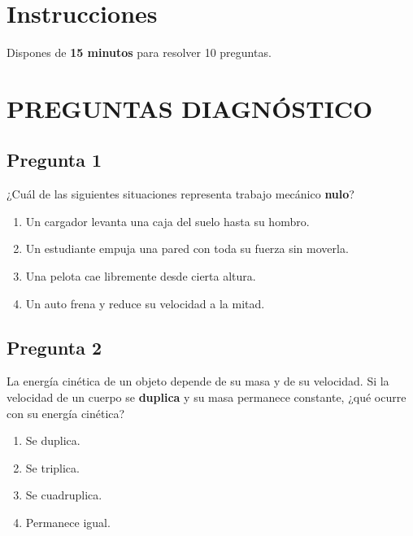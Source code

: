 \renewcommand{\tema}{Examen Diagnóstico - Trabajo y Leyes de la Conservación}

\twocolumn
\section{Instrucciones}

Dispones de \textbf{15 minutos} para resolver 10 preguntas.



\section{PREGUNTAS DIAGNÓSTICO}

\begin{preguntabox}
\subsection{Pregunta 1}
¿Cuál de las siguientes situaciones representa trabajo mecánico \textbf{nulo}?

\begin{enumerate}
    \item[A)] Un cargador levanta una caja del suelo hasta su hombro.
    \item[B)] Un estudiante empuja una pared con toda su fuerza sin moverla.
    \item[C)] Una pelota cae libremente desde cierta altura.
    \item[D)] Un auto frena y reduce su velocidad a la mitad.
\end{enumerate}
\end{preguntabox}

\begin{preguntabox}
\subsection{Pregunta 2}
La energía cinética de un objeto depende de su masa y de su velocidad. Si la velocidad de un cuerpo se \textbf{duplica} y su masa permanece constante, ¿qué ocurre con su energía cinética?

\begin{enumerate}
    \item[A)] Se duplica.
    \item[B)] Se triplica.
    \item[C)] Se cuadruplica.
    \item[D)] Permanece igual.
\end{enumerate}
\end{preguntabox}

